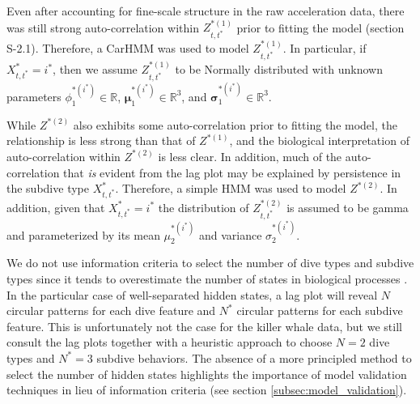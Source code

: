 Even after accounting for fine-scale structure in the raw acceleration data, there was still strong auto-correlation within $Z^{*(1)}_{t,t^*}$ prior to fitting the model (section S-2.1). Therefore, a CarHMM was used to model $Z^{*(1)}_{t,t^*}$. In particular, if $X^*_{t,t^*} = i^*$, then we assume $Z^{*(1)}_{t,t^*}$ to be Normally distributed with unknown parameters $\phi_1^{*(i^*)} \in \mathbb{R}$, $\mathbf{\mu}_1^{*(i^*)} \in \mathbb{R}^3$, and $\mathbf{\sigma}_1^{*(i^*)} \in \mathbb{R}^3$.
%
%

While $Z^{*(2)}$ also exhibits some auto-correlation prior to fitting the model, the relationship is less strong than that of $Z^{*(1)}$, and the biological interpretation of auto-correlation within $Z^{*(2)}$ is less clear. In addition, much of the auto-correlation that \textit{is} evident from the lag plot may be explained by persistence in the subdive type $X^*_{t,t^*}$. Therefore, a simple HMM was used to model $Z^{*(2)}$. In addition, given that $X^*_{t,t^*} = i^*$ the distribution of $Z^{*(2)}_{t,t^*}$ is assumed to be gamma and parameterized by its mean $\mu_2^{*(i^*)}$ and variance $\sigma_2^{*(i^*)}$.
%
%

We do not use information criteria to select the number of dive types and subdive types since it tends to overestimate the number of states in biological processes \citep{Pohle:2017}. In the particular case of well-separated hidden states, a lag plot will reveal $N$ circular patterns for each dive feature and $N^*$ circular patterns for each subdive feature. This is unfortunately not the case for the killer whale data, but we still consult the lag plots together with a heuristic approach to choose $N = 2$ dive types and $N^* = 3$ subdive behaviors. The absence of a more principled method to select the number of hidden states highlights the importance of model validation techniques in lieu of information criteria (see section \ref{subsec:model_validation}). 

